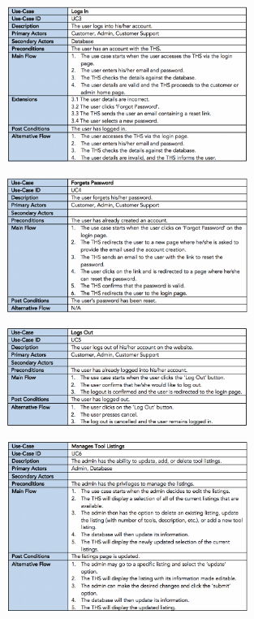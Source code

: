 \begin{figure}[H]
      \centering
      \includegraphics[trim = 0 0 0 0, clip, width=0.7\textwidth]{TempImg/UC3.png}
 \end{figure}

\begin{figure}[H]
      \centering
      \includegraphics[trim = 0 0 0 0, clip, width=0.7\textwidth]{TempImg/UC4.png}
 \end{figure}

\begin{figure}[H]
      \centering
      \includegraphics[trim = 0 0 0 0, clip, width=0.7\textwidth]{TempImg/UC5.png}
 \end{figure}

\begin{figure}[H]
      \centering
      \includegraphics[trim = 0 0 0 0, clip, width=0.7\textwidth]{TempImg/UC6.png}
 \end{figure}

